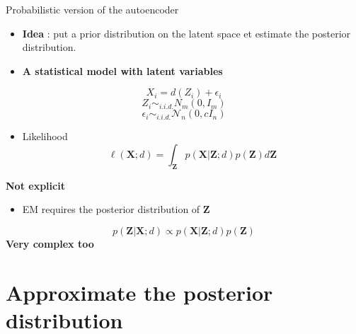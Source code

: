 \documentclass[
  12pt,
  ignorenonframetext,
  compress]{beamer}
\providecommand{\tightlist}{%
  \setlength{\itemsep}{0pt}\setlength{\parskip}{0pt}}
\begin{document}
\begin{frame}{Probabilistic version of the autoencoder}
\begin{itemize}
\item
  \textbf{Idea} : put a prior distribution on the latent space et
  estimate the posterior distribution.
\item
  \textbf{A statistical model with latent variables}
\end{itemize}

\[X_i =d(Z_i) + \epsilon_i\] \[Z_i \sim_{i.i.d.}N_m(0,I_m)\]
\[\epsilon_i \sim_{i.i.d.} \mathcal{N}_n(0,c I_n)\]

\begin{itemize}
\tightlist
\item
  Likelihood
  \[\ell(\mathbf{X}; d)  =  \int_{\mathbf{Z}} p(\mathbf{X} | \mathbf{Z};d)p(\mathbf{Z})d\mathbf{Z}\]
\end{itemize}

\textbf{Not explicit}

\begin{itemize}
\tightlist
\item
  EM requires the posterior distribution of \(\mathbf{Z}\)
\end{itemize}

\[p(\mathbf{Z} | \mathbf{X}; d) \propto p(\mathbf{X}|\mathbf{Z}; d)p(\mathbf{Z}) \]
\textbf{Very complex too}
\end{frame}

\begin{frame}
\end{frame}

\hypertarget{approximate-the-posterior-distribution}{%
\section{Approximate the posterior
distribution}\label{approximate-the-posterior-distribution}}
\end{document}
